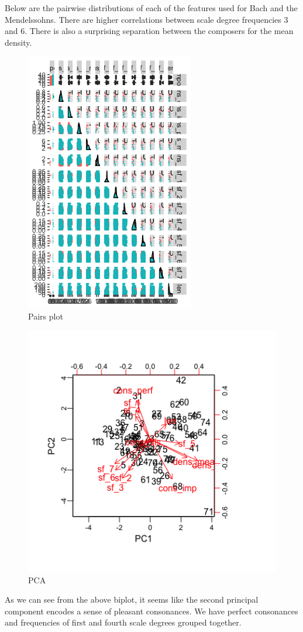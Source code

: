 \documentclass[12pt,twoside]{reedthesis}
\theoremstyle{definition}
\theoremstyle{definition}
\theoremstyle{definition}
\theoremstyle{remark}
\begin{document}
Below are the pairwise distributions of each of the features used for
Bach and the Mendelssohns. There are higher correlations between scale
degree frequencies 3 and 6. There is also a surprising separation
between the composers for the mean density.
\begin{figure}
\centering
\includegraphics{images/Couplet.png}
\caption{\label{fig:unnamed-chunk-8}Pairs plot}
\end{figure}
\begin{figure}
\centering
\includegraphics{images/PCA_bach.png}
\caption{\label{fig:unnamed-chunk-9}PCA}
\end{figure}
As we can see from the above biplot, it seems like the second principal
component encodes a sense of pleasant consonances. We have perfect
consonances and frequencies of first and fourth scale degrees grouped
together.
\end{document}
